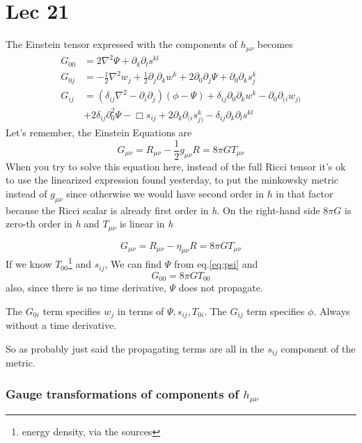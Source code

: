 \section{Lec 21}
The Einstein tensor expressed with the components of $h_{\mu \nu }$ becomes
\begin{align}
	G_{00} &= 2 \nabla ^{2}\Psi + \partial_{k}\partial_{l}s^{kl} \label{eq:psi}\\
	G_{0j} &= -\frac{1}{2} \nabla ^{2}w_{j}+\frac{1}{2}\partial_{j}\partial_{k}w^{k} + 2 \partial_{0}\partial_{j}\Psi + \partial_{0}\partial_{k}s^{k}_{j} \\
	G_{ij} &= \left( \delta _{ij} \nabla ^{2} - \partial_{i}\partial_{j} \right)\left( \phi -\Psi  \right) + \delta _{ij}\partial_{0}\partial_{k}w^{k} - \partial_{0}\partial_{( i}w_{j)} \nonumber \\
	       & +2\delta _{ij}\partial_{0}^{2}\Psi - \Box s_{ij} + 2\partial_{k}\partial_{( i}s_{j)}^{k}-\delta _{ij}\partial_{k}\partial_{l}s^{kl} 
\end{align}
Let's remember, the Einstein Equations are
\[
G_{\mu \nu } = R_{\mu \nu } -\frac{1}{2}g_{\mu \nu }R = 8\pi G T_{\mu \nu }
\]
When you try to solve this equation here, instead of the full Ricci tensor it's ok to use the linearized expression found yesterday, to put the minkowsky metric instead of $g_{\mu \nu }$ since otherwise we would have second order in $h$ in that factor because the Ricci scalar is already first order in \emph{h}. On the right-hand side $8\pi G$ is zero-th order in \emph{h} and $T_{\mu \nu } $ is linear in \emph{h}\par
\[
G_{\mu \nu } = R_{\mu \nu } -\eta _{\mu \nu }R = 8\pi G T_{\mu \nu }
\]
If we know $T_{00 }$\footnote{energy density, via the sources} and $s_{ij}$, We can find $\Psi $ from eq.\ref{eq:psi} and
\[
G_{00} = 8\pi G T_{00}
\]
also, since there is no time derivative, $\Psi $ does not propagate.\par
The $G_{0i}$ term specifies $w_{j}$ in terms of $\Psi, s_{ij}, T_{0i}$. The $G_{ij}$ term specifies $\phi$. Always without a time derivative. \par
So as probably just said the propagating terms are all in the $s_{ij}$ component of the metric.\par
\subsubsection{Gauge transformations of components of $h_{\mu \nu }$}

